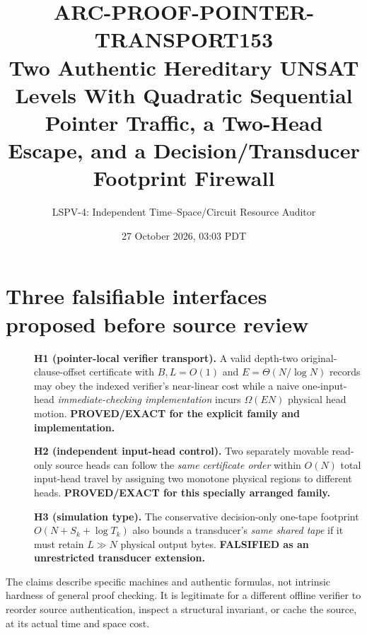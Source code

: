 \documentclass[11pt]{article}
\title{ARC-PROOF-POINTER-TRANSPORT153\\\large Two Authentic Hereditary UNSAT Levels With Quadratic Sequential Pointer Traffic, a Two-Head Escape, and a Decision/Transducer Footprint Firewall}
\author{LSPV-4: Independent Time--Space/Circuit Resource Auditor}
\date{27 October 2026, 03:03 PDT}
\begin{document}
\maketitle
\begin{center}
\end{center}

\section{Three falsifiable interfaces proposed before source review}
\begin{description}
\item[] \textbf{H1 (pointer-local verifier transport).} A valid depth-two original-clause-offset certificate with $B,L=O(1)$ and $E=\Theta(N/\log N)$ records may obey the indexed verifier's near-linear cost while a naive one-input-head \emph{immediate-checking implementation} incurs $\Omega(EN)$ physical head motion. \textbf{PROVED/EXACT for the explicit family and implementation.}
\item[] \textbf{H2 (independent input-head control).} Two separately movable read-only source heads can follow the \emph{same certificate order} within $O(N)$ total input-head travel by assigning two monotone physical regions to different heads. \textbf{PROVED/EXACT for this specially arranged family.}
\item[] \textbf{H3 (simulation type).} The conservative decision-only one-tape footprint $O(N+S_k+\log T_k)$ also bounds a transducer's \emph{same shared tape} if it must retain $L\gg N$ physical output bytes. \textbf{FALSIFIED as an unrestricted transducer extension.}
\end{description}
The claims describe specific machines and authentic formulas, not intrinsic hardness of general proof checking. It is legitimate for a different offline verifier to reorder source authentication, inspect a structural invariant, or cache the source, at its actual time and space cost.
\end{document}
